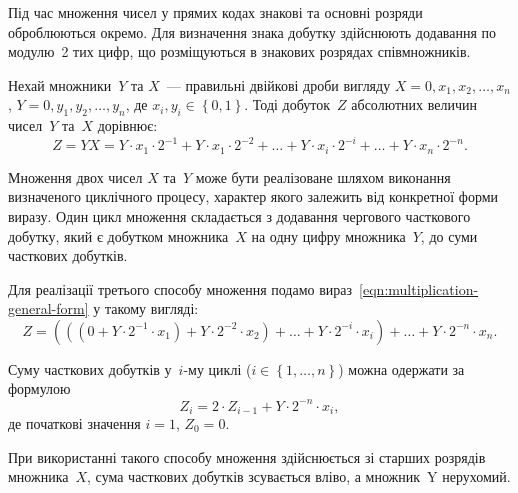 \documentclass[a4paper,oneside,DIV=12,12pt]{scrartcl}
\begin{document}
	\begin{solution}
		Під час множення чисел у прямих кодах знакові та основні розряди оброблюються окремо. Для визначення знака добутку здійснюють додавання по модулю~2 тих цифр, що розміщуються в знакових розрядах співмножників.
		
		Нехай множники~$Y$ та $X$~— правильні двійкові дроби вигляду $X = 0, x_1, x_2, \dots, x_n$, $Y = 0, y_1, y_2, \dots, y_n$, де $x_i, y_i \in \left\{0, 1\right\}$. Тоді добуток~$Z$ абсолютних величин чисел~$Y$ та~$X$ дорівнює:
		\begin{equation}
		\label{eqn:multiplication-general-form}
			Z = YX
			  = Y \cdot x_1 \cdot 2^{-1}
			  + Y \cdot x_1 \cdot 2^{-2}
			  + \ldots
			  + Y \cdot x_i \cdot 2^{-i}
			  + \ldots
			  + Y \cdot x_n \cdot 2^{-n}.
		\end{equation}
		
		Множення двох чисел $X$ та~$Y$ може бути реалізоване шляхом виконання визначеного циклічного процесу, характер якого залежить від конкретної форми виразу. Один цикл множення складається з додавання чергового часткового добутку, який є добутком множника~$X$ на одну цифру множника~$Y$, до суми часткових добутків.
		
		Для реалізації третього способу множення подамо вираз~\eqref{eqn:multiplication-general-form} у такому вигляді:
		\[
			Z =
			\left(
				\left(
					\left(
						0
						+ Y \cdot 2^{-1} \cdot x_1
					\right)
					+ Y \cdot 2^{-2} \cdot x_2
				\right)
				+ \ldots
				+ Y \cdot 2^{-i} \cdot x_i
			\right)
			+ \ldots
			+ Y \cdot 2^{-n} \cdot x_n.
		\]
		
		Суму часткових добутків у~$i$-му циклі ($i \in \left\{ 1, \dots, n \right\}$) можна одержати за формулою
		\[
			Z_i = 2 \cdot Z_{i - 1} + Y \cdot 2^{-n} \cdot x_i,
		\]
		де початкові значення $i = 1$, $Z_0 = 0$.
		
		При використанні такого способу множення здійснюється зі старших розрядів множника~$X$, сума часткових добутків зсувається вліво, а множник~Y нерухомий.
		

\end{solution}
\end{document}
